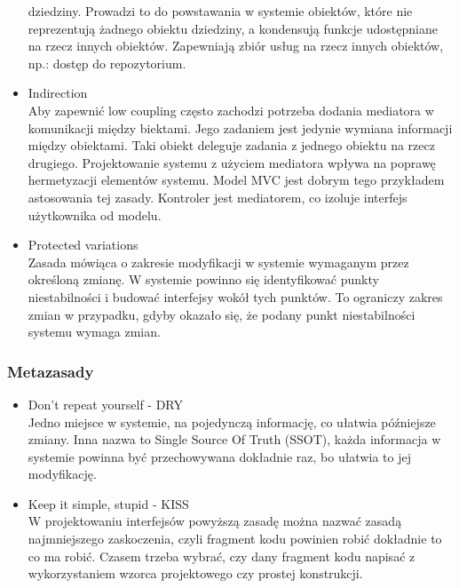 \documentclass[a4paper]{article}
\begin{document}
\begin{itemize}
        dziedziny. Prowadzi to do powstawania w
        systemie obiektów, które nie reprezentują
        żadnego obiektu dziedziny, a kondensują
        funkcje udostępniane na rzecz innych
        obiektów.
        Zapewniają zbiór usług na rzecz innych
        obiektów, np.: dostęp do repozytorium.
        \item Indirection\\
        Aby zapewnić low coupling często zachodzi potrzeba
        dodania mediatora w komunikacji między biektami.
        Jego zadaniem jest jedynie wymiana informacji
        między obiektami. Taki obiekt deleguje zadania z
        jednego obiektu na rzecz drugiego. Projektowanie
        systemu z użyciem mediatora wpływa na poprawę
        hermetyzacji elementów systemu.
        Model MVC jest dobrym tego przykładem astosowania
        tej zasady. Kontroler jest mediatorem, co izoluje
        interfejs użytkownika od modelu.
        \item Protected variations\\
        Zasada mówiąca o zakresie modyfikacji w systemie
        wymaganym przez określoną zmianę. W systemie
        powinno się identyfikować punkty niestabilności i
        budować interfejsy wokół tych punktów.
        To ograniczy zakres zmian w przypadku, gdyby
        okazało się, że podany punkt niestabilności systemu
        wymaga zmian.
    \end{itemize}




\subsubsection{Metazasady}


\begin{itemize}
    \item Don't repeat yourself - DRY\\
    Jedno miejsce w systemie, na pojedynczą informację,
    co ułatwia późniejsze zmiany.
    Inna nazwa to Single Source Of Truth (SSOT), każda
    informacja w systemie powinna być przechowywana
    dokładnie raz, bo ułatwia to jej modyfikację.
    \item Keep it simple, stupid - KISS\\
    W projektowaniu interfejsów powyższą zasadę można
    nazwać zasadą najmniejszego zaskoczenia, czyli
    fragment kodu powinien robić dokładnie to co ma
    robić.
    Czasem trzeba wybrać, czy dany fragment kodu
    napisać z wykorzystaniem wzorca projektowego czy
    prostej konstrukcji.
\end{itemize}
\end{document}
